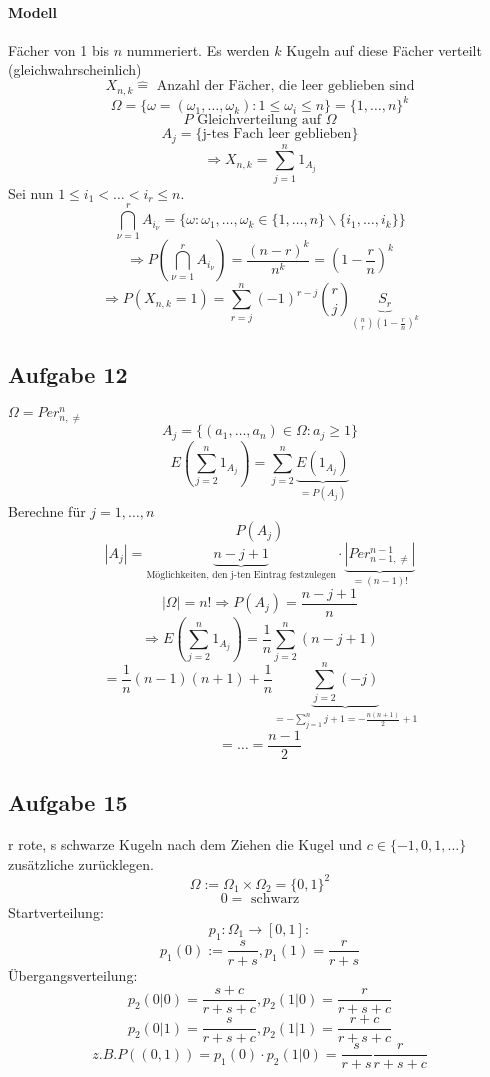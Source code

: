 \documentclass[a4paper,11pt,notitlepage]{report}
\begin{document}
\paragraph{Modell}
Fächer von 1 bis $n$ nummeriert.
Es werden $k$ Kugeln auf diese Fächer verteilt (gleichwahrscheinlich)
$$X_{n,k} \hat{=} \text{ Anzahl der Fächer, die leer geblieben sind}$$
$$\Omega = \{ \omega = (\omega_1, \ldots, \omega_k) \colon 1 \leq \omega_i \leq n\} = \{1, \ldots, n\}^k$$
$$P \text{ Gleichverteilung auf } \Omega$$
$$A_j = \{\text{j-tes Fach leer geblieben} \}$$
$$\Rightarrow X_{n,k} = \sum\limits_{j=1}^n{1_{A_j}}$$
Sei nun $1 \leq i_1 < \ldots < i_r \leq n$.
$$\bigcap\limits_{\nu=1}^r{A_{i_\nu}} = \{ \omega \colon \omega_1, \ldots, \omega_k \in \{1, \ldots,n\} \backslash \{i_1, \ldots, i_k\}\}$$
$$\Rightarrow P(\bigcap\limits_{\nu = 1}^r{{A}_{i_\nu}}) = \frac{(n-r)^k}{n^k} = \left(1-\frac{r}{n}\right)^k$$
$$\Rightarrow P(X_{n,k}=1) = \sum\limits_{r=j}^n{(-1)^{r-j}{r \choose j}\underbrace{S_r}_{{n \choose r}(1- \frac{r}{n})^k}}$$

\subsection{Aufgabe 12}
$\Omega = Per_{n, \neq}^n$
$$A_j = \{(a_1, \ldots, a_n) \in \Omega \colon a_j \geq 1\}$$
$$E(\sum\limits_{j=2}^n{1_{A_j}}) = \sum\limits_{j=2}^n{\underbrace{E(1_{A_j})}_{=P(A_j)}}$$
Berechne für $j=1, \ldots, n$
$$P(A_j)$$
$$|A_j| = \underbrace{n-j+1}_{\text{Möglichkeiten, den j-ten Eintrag festzulegen}} \cdot \underbrace{|Per_{n-1, \neq}^{n-1}|}_{=(n-1)!}$$
$$|\Omega| = n! \Rightarrow P(A_j) = \frac{n-j+1}{n}$$
$$\Rightarrow E\left( \sum\limits_{j=2}^n{1_{A_j}} \right)= \frac{1}{n} \sum\limits_{j=2}^n{(n-j+1)}$$
$$= \frac{1}{n}(n-1)(n+1) + \frac{1}{n}\underbrace{\sum\limits_{j=2}^n{(-j)}}_{= - \sum\limits_{j=1}^n{j}+1 = -\frac{n(n+1)}{2}+1}$$
$$=\ldots=\frac{n-1}{2}$$

\subsection{Aufgabe 15}
r rote, s schwarze Kugeln
\newline
nach dem Ziehen die Kugel und $c \in \{-1,0,1,\ldots\}$ zusätzliche zurücklegen.
$$\Omega := \Omega_1 \times \Omega_2 = \{0,1\}^2$$
$$0 \hat{=} \text{ schwarz}$$
Startverteilung:
$$p_1 \colon \Omega_1 \rightarrow [0,1]:$$
$$p_1(0):=\frac{s}{r+s}, p_1(1)=\frac{r}{r+s}$$
Übergangsverteilung:
$$p_2(0|0) = \frac{s+c}{r+s+c}, p_2(1|0) = \frac{r}{r+s+c}$$
$$p_2(0|1)= \frac{s}{r+s+c}, p_2(1|1)=\frac{r+c}{r+s+c}$$
$$z.B. P\left((0,1)\right) = p_1(0) \cdot p_2(1|0)= \frac{s}{r+s}\frac{r}{r+s+c}$$
\end{document}
